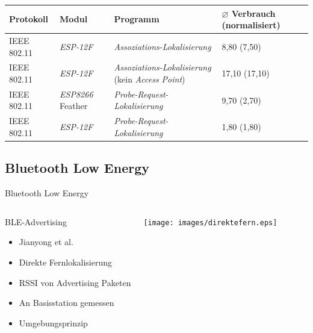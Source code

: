 \documentclass[18pt]{beamer}
\begin{document}
\begin{frame}
	\begin{tabular}{l|l|p{3.1cm}|R{2.1cm}}
		Protokoll & Modul & Programm  & $\varnothing$ Verbrauch (normalisiert)\\
		\hline
		IEEE 802.11 & \emph{ESP-12F} & \emph{Assoziations-Lokalisierung} & 8,80 (7,50)\\
		IEEE 802.11 & \emph{ESP-12F} & \emph{Assoziations-Lokalisierung} (kein \emph{Access Point}) & 17,10 (17,10)\\
		\hline
		IEEE 802.11 & \emph{ESP8266} Feather & \emph{Probe-Request-Lokalisierung} & 9,70 (2,70)\\
		IEEE 802.11 & \emph{ESP-12F} & \emph{Probe-Request-Lokalisierung} & 1,80 (1,80)\\
		\hline
	\end{tabular}
\end{frame}


\subsection{Bluetooth Low Energy}
\begin{frame}{Bluetooth Low Energy}
	\begin{columns}
			\begin{block}{BLE-Advertising}
				\begin{itemize}
					\item Jianyong et al. \cite{jianyong2014rssi}
					\item Direkte Fernlokalisierung
					\item RSSI von Advertising Paketen
					\item An Basisstation gemessen
					\item Umgebungsprinzip
				\end{itemize}
			\end{block}
			\centering
			\texttt{[image: images/direktefern.eps]}
	\end{columns}
\end{frame}
\end{document}
